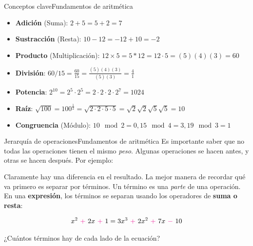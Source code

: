 \documentclass[spanish, handout]{beamer}
\begin{document}
\begin{frame}{Conceptos clave}{Fundamentos de aritmética}
    \begin{itemize}
        \item<1-> { \textbf{Adición} (Suma): \hfill $2 + 5 = 5 + 2 = 7$}
        \item<2-> { \textbf{Sustracción} (Resta): \hfill $10 - 12 = -12 + 10 = -2$}
        \item<3-> { \textbf{Producto} (Multiplicación): \hfill $12 \times 5 = 5 * 12 = 12 \cdot 5 = (5)(4)(3) = 60$}
        \item<4-> { \textbf{División}: \hfill $60 / 15 =  \frac{60}{15} = \frac{(5)(4)(3)}{(5)(3)} = \frac{4}{1}$}
        \item<5-> { \textbf{Potencia}: \hfill $2^{10} = 2^5 \cdot 2^5 = 2 \cdot 2 \cdot 2 \cdot 2^7 = 1024$}
        \item<6-> { \textbf{Raíz}: \hfill $\sqrt{100} = 100^{\frac{1}{2}} = \sqrt{2 \cdot 2 \cdot 5 \cdot 5} = \sqrt{2} \sqrt{2} \sqrt{5} \sqrt{5} = 10$}
        \item<7-> \textbf{Congruencia} (Módulo): \hfill $10 \mod 2 = 0, 15 \mod 4 = 3, 19 \mod 3 = 1$
    \end{itemize}
\end{frame}

\begin{frame}{Jerarquía de operaciones}{Fundamentos de aritmética}
    Es importante saber que no todas las operaciones tienen el mismo \textit{peso}.
    Algunas operaciones se hacen antes, y otras se hacen después. Por ejemplo: \pause

     \pause


    Claramente hay una diferencia en el resultado. La mejor manera de recordar qué va primero es separar por \alert{términos}. \pause Un \alert{término} es una \textit{parte} de una operación. En una \textbf{expresión}, los términos se separan usando los operadores de \textbf{\color{magenta} suma o resta}:

    $$x^2 {~\color{magenta}+~} 2x {~\color{magenta}+~} 1 = 3x^3 {~\color{magenta}+~} 2x^2 {~\color{magenta}+~} 7x {~\color{magenta}-~} 10$$ \pause

    \begin{center}
        \Large
        ¿Cuántos términos hay de cada lado de la ecuación?
    \end{center}
    
\end{frame}
\end{document}
